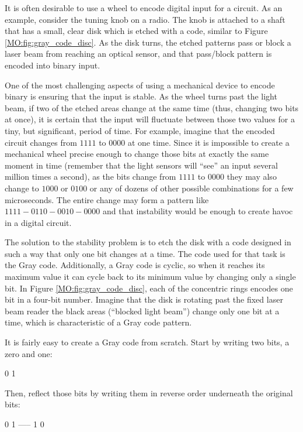 It is often desirable to use a wheel to encode digital input for a circuit. As an example, consider the tuning knob on a radio. The knob is attached to a shaft that has a small, clear disk which is etched with a code, similar to Figure \ref{MO:fig:gray_code_disc}. As the disk turns, the etched patterns pass or block a laser beam from reaching an optical sensor, and that pass/block pattern is encoded into binary input. 

One of the most challenging aspects of using a mechanical device to encode binary is ensuring that the input is stable. As the wheel turns past the light beam, if two of the etched areas change at the same time (thus, changing two bits at once), it is certain that the input will fluctuate between those two values for a tiny, but significant, period of time. For example, imagine that the encoded circuit changes from $ 1111 $ to $ 0000 $ at one time. Since it is impossible to create a mechanical wheel precise enough to change those bits at exactly the same moment in time (remember that the light sensors will ``see'' an input several million times a second), as the bits change from $ 1111 $ to $ 0000 $ they may also change to $ 1000 $ or $ 0100 $ or any of dozens of other possible combinations for a few microseconds. The entire change may form a pattern like $ 1111-0110-0010-0000 $ and that instability would be enough to create havoc in a digital circuit. 

The solution to the stability problem is to etch the disk with a code designed in such a way that only one bit changes at a time. The code used for that task is the Gray code. Additionally, a Gray code is cyclic, so when it reaches its maximum value it can cycle back to its minimum value by changing only a single bit. In Figure \ref{MO:fig:gray_code_disc}, each of the concentric rings encodes one bit in a four-bit number. Imagine that the disk is rotating past the fixed laser beam reader \textemdash the black areas (``blocked light beam'') change only one bit at a time, which is characteristic of a Gray code pattern.

It is fairly easy to create a Gray code from scratch. Start by writing two bits, a zero and one: 

\begin{binDisp}[commandchars=~\[\]]
     0
     1
\end{binDisp}

Then, reflect those bits by writing them in reverse order underneath the original bits:

\begin{binDisp}[commandchars=~\[\]]
     0
     1
   -----
     1
     0
\end{binDisp}

